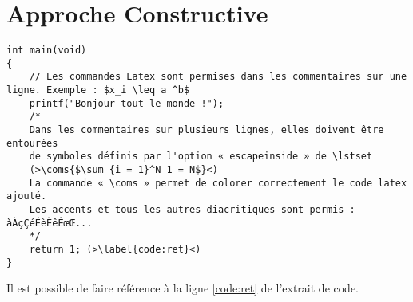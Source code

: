 \section{Approche Constructive}

\begin{lstlisting}[caption={Un programme tout simple}]
int main(void)
{
    // Les commandes Latex sont permises dans les commentaires sur une ligne. Exemple : $x_i \leq a ^b$
    printf("Bonjour tout le monde !");
    /*
    Dans les commentaires sur plusieurs lignes, elles doivent être entourées
    de symboles définis par l'option « escapeinside » de \lstset
    (>\coms{$\sum_{i = 1}^N 1 = N$}<)
    La commande « \coms » permet de colorer correctement le code latex ajouté.
    Les accents et tous les autres diacritiques sont permis : àÀçÇéÉèÈêÊœŒ...
    */
    return 1; (>\label{code:ret}<)
}
\end{lstlisting}

Il est possible de faire référence à la ligne \ref{code:ret} de l'extrait de code.
